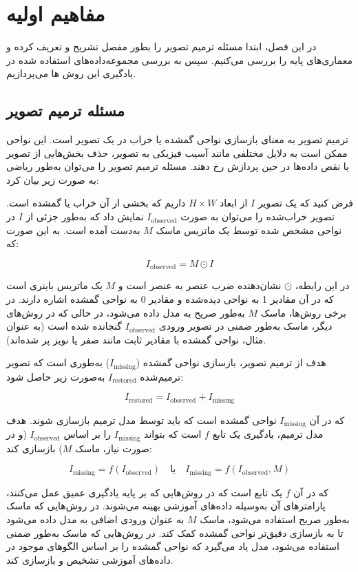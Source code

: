 
\chapter{مفاهیم اولیه}

در این فصل،‌ ابتدا مسئله ترمیم تصویر را بطور مفصل تشریح و تعریف کرده و معماری‌های پایه را بررسی می‌کنیم. سپس به بررسی مجموعه‌داده‌های استفاده شده در یادگیری این روش ها می‌پردازیم.

\section{مسئله ترمیم تصویر}


ترمیم تصویر به معنای بازسازی نواحی گمشده یا خراب در یک تصویر است. این نواحی ممکن است به دلایل مختلفی مانند آسیب فیزیکی به تصویر، حذف بخش‌هایی از تصویر یا نقص داده‌ها در حین پردازش رخ دهند. مسئله ترمیم تصویر را می‌توان به‌طور ریاضی به صورت زیر بیان کرد:

فرض کنید که یک تصویر \(I\) از ابعاد \(H \times W\) داریم که بخشی از آن خراب یا گمشده است. تصویر خراب‌شده را می‌توان به صورت \(I_{\text{observed}}\) نمایش داد که به‌طور جزئی از \(I\) در نواحی مشخص شده توسط یک ماتریس ماسک \(M\) به‌دست آمده است. به این صورت که:

\[
I_{\text{observed}} = M \odot I
\]

در این رابطه، \(\odot\) نشان‌دهنده ضرب عنصر به عنصر است و \(M\) یک ماتریس باینری است که در آن مقادیر 1 به نواحی دیده‌شده و مقادیر 0 به نواحی گمشده اشاره دارند. در برخی روش‌ها، ماسک \(M\) به‌طور صریح به مدل داده می‌شود، در حالی که در روش‌های دیگر، ماسک به‌طور ضمنی در تصویر ورودی \(I_{\text{observed}}\) گنجانده شده است (به عنوان مثال، نواحی گمشده با مقادیر ثابت مانند صفر یا نویز پر شده‌اند).

هدف از ترمیم تصویر، بازسازی نواحی گمشده (\(I_{\text{missing}}\)) به‌طوری است که تصویر ترمیم‌شده \(I_{\text{restored}}\) به‌صورت زیر حاصل شود:

\[
I_{\text{restored}} = I_{\text{observed}} + I_{\text{missing}}
\]

که در آن \(I_{\text{missing}}\) نواحی گمشده است که باید توسط مدل ترمیم بازسازی شوند. هدف مدل ترمیم، یادگیری یک تابع \(f\) است که بتواند \(I_{\text{missing}}\) را بر اساس \(I_{\text{observed}}\) (و در صورت نیاز، ماسک \(M\)) بازسازی کند:

\[
I_{\text{missing}} = f(I_{\text{observed}}) \quad \text{یا} \quad I_{\text{missing}} = f(I_{\text{observed}}, M)
\]

که در آن \(f\) یک تابع است که در روش‌هایی که بر پایه یادگیری عمیق عمل می‌کنند، پارامترهای آن به‌وسیله داده‌های آموزشی بهینه می‌شوند. در روش‌هایی که ماسک به‌طور صریح استفاده می‌شود، ماسک \(M\) به عنوان ورودی اضافی به مدل داده می‌شود تا به بازسازی دقیق‌تر نواحی گمشده کمک کند. در روش‌هایی که ماسک به‌طور ضمنی استفاده می‌شود، مدل یاد می‌گیرد که نواحی گمشده را بر اساس الگوهای موجود در داده‌های آموزشی تشخیص و بازسازی کند.

